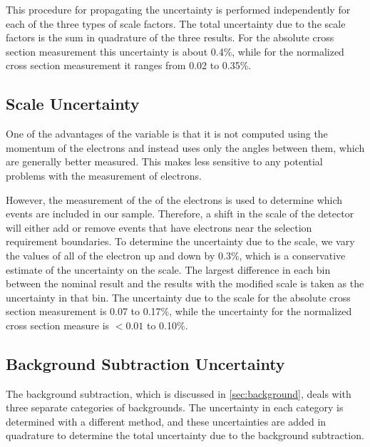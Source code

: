 This procedure for propagating the uncertainty is performed independently for
each of the three types of scale factors. The total uncertainty due to the
scale factors is the sum in quadrature of the three results. For the absolute
cross section measurement this uncertainty is about 0.4\%, while for the
normalized cross section measurement it ranges from 0.02 to 0.35\%.

\subsection{\texorpdfstring{\pt}{PT} Scale Uncertainty}
\label{ssec:pt_scale_uncertainty}

One of the advantages of the \phistar variable is that it is not computed using
the momentum of the electrons and instead uses only the angles between them,
which are generally better measured. This makes \phistar less sensitive to any
potential problems with the \pt measurement of electrons.

However, the measurement of the \pt of the electrons is used to determine which
events are included in our sample. Therefore, a shift in the \pt scale of the
detector will either add or remove events that have electrons near the \pt
selection requirement boundaries. To determine the uncertainty due to the \pt
scale, we vary the \pt values of all of the electron up and down by 0.3\%,
which is a conservative estimate of the uncertainty on the \pt scale. The
largest difference in each \phistar bin between the nominal result and the
results with the modified \pt scale is taken as the uncertainty in that bin.
The uncertainty due to the \pt scale for the absolute cross section measurement
is 0.07 to 0.17\%, while the uncertainty for the normalized cross section
measure is $< 0.01$ to 0.10\%.

\subsection{Background Subtraction Uncertainty}
\label{ssec:background_subtraction_uncertainty}

The background subtraction, which is discussed in \cref{sec:background},
deals with three separate categories of backgrounds. The uncertainty in
each category is determined with a different method, and these uncertainties
are added in quadrature to determine the total uncertainty due to the
background subtraction.

